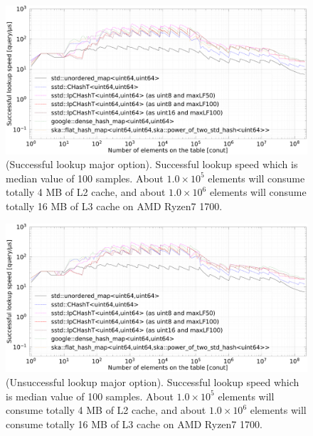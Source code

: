 \begin{figure}[h]
  \hspace{-3mm}
  \includegraphics[scale=0.24]{./fig_bench_sm/find_successful_lookup_med.pdf}
  \caption{
    (Successful lookup major option). Successful lookup speed which is median value of 100 samples.
    About $1.0\times10^5$ elements will consume totally 4 MB of L2 cache,
    and about $1.0\times10^6$ elements will consume totally 16 MB of L3 cache on AMD Ryzen7 1700.
  }
  \label{fig_bench_find_s_sm}
\end{figure}

\begin{figure}[h]
  \hspace{-3mm}
  \includegraphics[scale=0.24]{./fig_bench_usm/find_successful_lookup_med.pdf}
  \caption{
    (Unsuccessful lookup major option). Successful lookup speed which is median value of 100 samples.
    About $1.0\times10^5$ elements will consume totally 4 MB of L2 cache,
    and about $1.0\times10^6$ elements will consume totally 16 MB of L3 cache on AMD Ryzen7 1700.
  }
  \label{fig_bench_find_s_um}
\end{figure}


